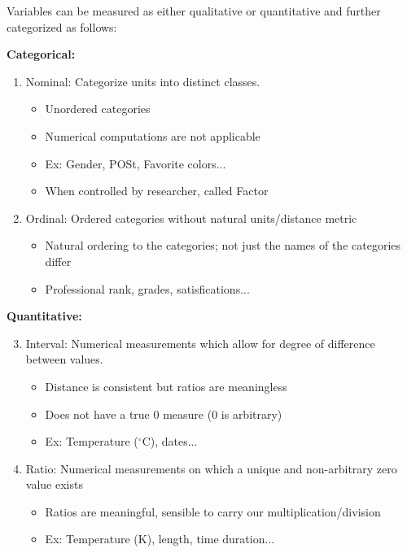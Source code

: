 \documentclass[a4paper,11pt]{article}
\begin{document}
Variables can be measured as either qualitative or quantitative and further categorized as follows:

\textbf{Categorical:}
\begin{enumerate}
\item Nominal: Categorize units into distinct classes. 
\begin{itemize}
\item Unordered categories
\item Numerical computations are not applicable
\item Ex: Gender, POSt, Favorite colors...
\item When controlled by researcher, called {Factor}
\end{itemize}
\item Ordinal: Ordered categories without natural units/distance metric
\begin{itemize}
\item Natural ordering to the categories; not just the names of the categories differ
\item Professional rank, grades, satisfications... 
\end{itemize}
\end{enumerate}
\textbf{Quantitative:}
\begin{enumerate}
\setcounter{enumi}{2}
\item Interval: Numerical measurements which allow for degree of difference between values. 
\begin{itemize}
\item Distance is consistent but ratios are meaningless
\item Does not have a true 0 measure (0 is arbitrary)
\item Ex: Temperature ($^{\circ}$C), dates...
\end{itemize}
\item Ratio: Numerical measurements on which a unique and non-arbitrary zero value exists
\begin{itemize}
\item Ratios are meaningful, sensible to carry our multiplication/division
\item Ex: Temperature (K), length, time duration...
\end{itemize}
\end{enumerate}
\end{document}
